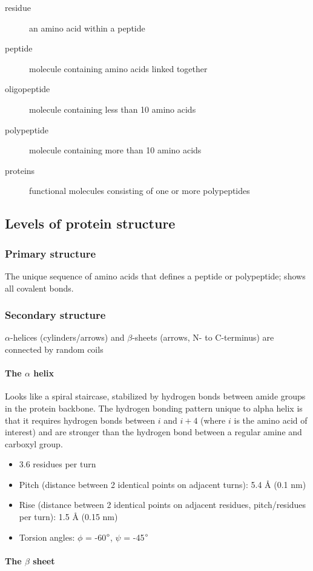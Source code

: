 \documentclass[letterpaper, 12pt]{article}
\begin{document}
\begin{description}
\item [residue] an amino acid within a peptide
\item [peptide] molecule containing amino acids linked together
\item [oligopeptide] molecule containing less than 10 amino acids
\item [polypeptide] molecule containing more than 10 amino acids
\item [proteins] functional molecules consisting of one or more polypeptides
\end{description}

\subsection*{Levels of protein structure}

\subsubsection*{Primary structure}
The unique sequence of amino acids that defines a peptide or polypeptide; shows all covalent bonds.

\subsubsection*{Secondary structure}
$\alpha$-helices (cylinders/arrows) and $\beta$-sheets (arrows, N- to C-terminus) are connected by random coils

\paragraph{The $\alpha$ helix} Looks like a spiral staircase, stabilized by hydrogen bonds between amide groups in the protein backbone. The hydrogen bonding pattern unique to alpha helix is that it requires hydrogen bonds between $i$ and $i+4$ (where $i$ is the amino acid of interest) and are stronger than the hydrogen bond between a regular amine and carboxyl group.

\begin{itemize}
\item 3.6 residues per turn
\item Pitch (distance between 2 identical points on adjacent turns): 5.4 Å (0.1 nm)
\item Rise (distance between 2 identical points on adjacent residues, pitch/residues per turn): 1.5 Å (0.15 nm)
\item Torsion angles: $\phi$ = -60$\degree$, $\psi$ = -45$\degree$
\end{itemize}

\paragraph{The $\beta$ sheet}
\end{document}
